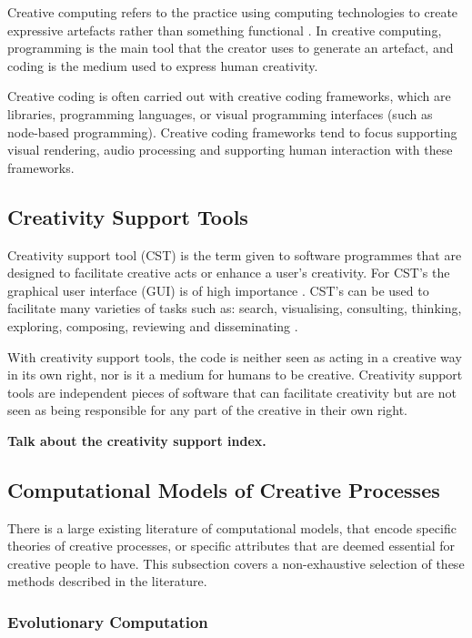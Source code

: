 Creative computing refers to the practice using computing technologies to create expressive artefacts rather than something functional \citep{yang2016promoting}.
In creative computing, programming is the main tool that the creator uses to generate an artefact, and coding is the medium used to express human creativity. 

Creative coding is often carried out with creative coding frameworks, which are libraries, programming languages, or visual programming interfaces (such as node-based programming). 
Creative coding frameworks tend to focus supporting visual rendering, audio processing and supporting human interaction with these frameworks. 


\subsection{Creativity Support Tools}
\label{c2:subsec:cst}

Creativity support tool (CST) is the term given to software programmes that are designed to facilitate creative acts or enhance a user's creativity\citep{shneiderman2002creativity}. 
For CST’s the graphical user interface (GUI) is of high importance \citep{shneiderman1999user}. 
CST’s can be used to facilitate many varieties of tasks such as: search, visualising, consulting, thinking, exploring, composing, reviewing and disseminating \citep{shneiderman2002cst_tutorial}.

With creativity support tools, the code is neither seen as acting in a creative way in its own right, nor is it a medium for humans to be creative. 
Creativity support tools are independent pieces of software that can facilitate creativity but are not seen as being responsible for any part of the creative in their own right.

\textbf{Talk about the creativity support index.}

\subsection{Computational Models of Creative Processes}

There is a large existing literature of computational models, that encode specific theories of creative processes, or specific attributes that are deemed essential for creative people to have. 
This subsection covers a non-exhaustive selection of these methods described in the literature.

\subsubsection{Evolutionary Computation}

